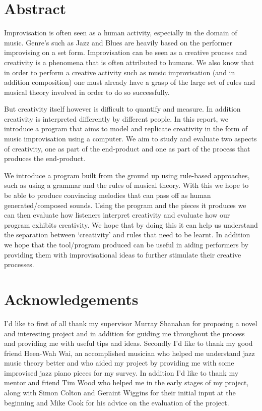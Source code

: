 \documentclass[pdftex,12pt,a4paper]{report}
\begin{document}


\chapter*{Abstract}%
%
Improvisation is often seen as a human activity, especially in the domain of music. Genre's such as Jazz and Blues are heavily based on the performer improvising on a set form. Improvisation can be seen as a creative process and creativity is a phenomena that is often attributed to humans. We also know that in order to perform a creative activity such as music improvisation (and in addition composition) one must already have a grasp of the large set of rules and musical theory involved in order to do so successfully.

But creativity itself however is difficult to quantify and measure. In addition creativity is interpreted differently by different people. In this report, we introduce a program that aims to model and replicate creativity in the form of music improvisation using a computer. We aim to study and evaluate two aspects of creativity, one as part of the end-product and one as part of the process that produces the end-product.

We introduce a program built from the ground up using rule-based approaches, such as using a grammar and the rules of musical theory. With this we hope to be able to produce convincing melodies that can pass off as human generated/composed sounds. Using the program and the pieces it produces we can then evaluate how listeners interpret creativity and evaluate how our program exhibits creativity. We hope that by doing this it can help us understand the separation between `creativity' and rules that need to be learnt. In addition we hope that the tool/program produced can be useful in aiding performers by providing them with improvisational ideas to further stimulate their creative processes.

\chapter*{Acknowledgements}%
%
I'd like to first of all thank my supervisor Murray Shanahan for proposing a novel and interesting project and in addition for guiding me throughout the process and providing me with useful tips and ideas. Secondly I'd like to thank my good friend Heen-Wah Wai, an accomplished musician who helped me understand jazz music theory better and who aided my project by providing me with some improvised jazz piano pieces for my survey. In addition I'd like to thank my mentor and friend Tim Wood who helped me in the early stages of my project, along with Simon Colton and Geraint Wiggins for their initial input at the beginning and Mike Cook for his advice on the evaluation of the project.
\end{document}
